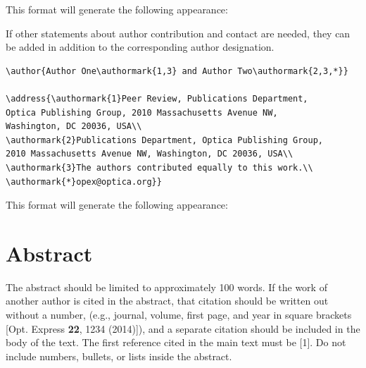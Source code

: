 \documentclass{../packages/optica-article}
\begin{document}
This format will generate the following appearance:


\author{Author One and Author Two}

\address{Peer Review, Publications Department,
	Optica Publishing Group, 2010 Massachusetts Avenue NW,
	Washington, DC 20036, USA\\
	Publications Department, Optica Publishing Group,
	2010 Massachusetts Avenue NW, Washington, DC 20036, USA\\

	}


If other statements about author contribution and contact are needed, they can be added in addition to the corresponding author designation.
\begin{verbatim}
\author{Author One\authormark{1,3} and Author Two\authormark{2,3,*}}

\address{\authormark{1}Peer Review, Publications Department,
Optica Publishing Group, 2010 Massachusetts Avenue NW,
Washington, DC 20036, USA\\
\authormark{2}Publications Department, Optica Publishing Group,
2010 Massachusetts Avenue NW, Washington, DC 20036, USA\\
\authormark{3}The authors contributed equally to this work.\\
\authormark{*}opex@optica.org}}
\end{verbatim}

This format will generate the following appearance:


\author{Author One and Author Two}

\address{Peer Review, Publications Department,
	Optica Publishing Group, 2010 Massachusetts Avenue NW, Washington, DC 20036, USA\\
	Publications Department, Optica Publishing Group, 2010 Massachusetts Avenue NW, Washington, DC 20036, USA\\
	The authors contributed equally to this work.\\
	\authormark{*}opex@optica.org}

\section{Abstract}
The abstract should be limited to approximately 100 words. If the work of another author is cited in the abstract, that citation should be written out without a number, (e.g., journal, volume, first page, and year in square brackets [Opt. Express {\bfseries 22}, 1234 (2014)]), and a separate citation should be included in the body of the text. The first reference cited in the main text must be [1]. Do not include numbers, bullets, or lists inside the abstract.
\end{document}
